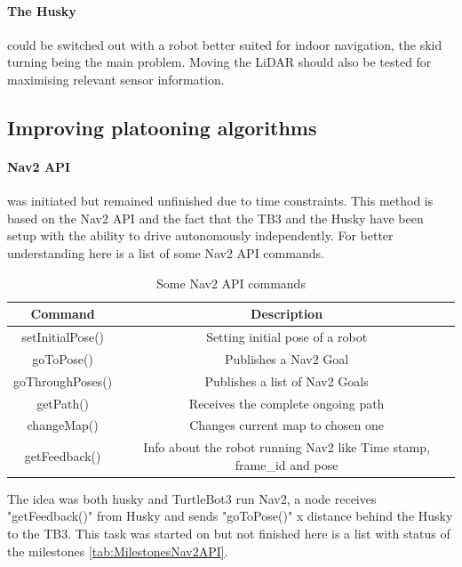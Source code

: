 \paragraph{The Husky} could be switched out with a robot better suited for indoor navigation, the skid turning being the main problem. Moving the LiDAR should also be tested for maximising relevant sensor information. 

\subsection{Improving platooning algorithms}

\paragraph{Nav2 API} \label{Further_work_Nav2_API} was initiated but remained unfinished due to time constraints. This method is based on the Nav2 API and the fact that the TB3 and the Husky have been setup with the ability to drive autonomously independently. For better understanding here is a list of some Nav2 API commands.

\begin{table}[H]
    \centering
    \begin{tabular}{c|c}
        Command             & Description \\ \hline
        setInitialPose()    & Setting initial pose of a robot \\
        goToPose()          & Publishes a Nav2 Goal \\
        goThroughPoses()    & Publishes a list of Nav2 Goals \\
        getPath()           & Receives the complete ongoing path \\
        changeMap()         & Changes current map to chosen one \\
        getFeedback() & Info about the robot running Nav2 like Time stamp, frame\_id and pose\\
    \end{tabular}
    \caption{Some Nav2 API commands \cite{rosnavAPI}}
    \label{tab:Nav2API}
\end{table}

The idea was both husky and TurtleBot3 run Nav2, a node receives "getFeedback()" from Husky and sends "goToPose()" x distance behind the Husky to the TB3. This task was started on but not finished here is a list with status of the milestones \ref{tab:MilestonesNav2API}.

